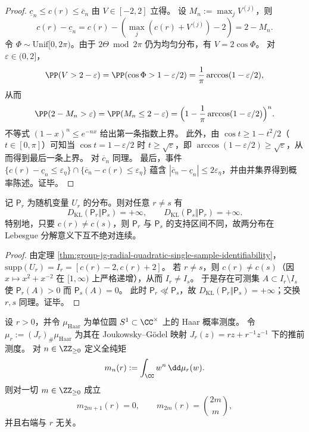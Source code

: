 \begin{proof}
\(\underline c_n\le c(r)\le \overline c_n\) 由 \(V\in[-2,2]\) 立得。
设 \(M_n:=\max_j V^{(j)}\)，则
\[
c(r)-\underline c_n=c(r)-(\max_j(c(r)+V^{(j)})-2)=2-M_n.
\]
令 \(\Phi\sim\mathrm{Unif}[0,2\pi)\)。由于 \(2\Theta\bmod 2\pi\) 仍为均匀分布，有 \(V=2\cos\Phi\)。
对 \(\varepsilon\in(0,2]\)，
\[
\PP(V>2-\varepsilon)=\PP(\cos\Phi>1-\varepsilon/2)=\frac{1}{\pi}\arccos(1-\varepsilon/2),
\]
从而
\[
\PP(2-M_n>\varepsilon)=\PP(M_n\le 2-\varepsilon)
=\Bigl(1-\frac{1}{\pi}\arccos(1-\varepsilon/2)\Bigr)^{n}.
\]
不等式 \((1-x)^n\le e^{-nx}\) 给出第一条指数上界。
此外，由 \(\cos t\ge 1-t^2/2\)（\(t\in[0,\pi]\)）可知当 \(\cos t=1-\varepsilon/2\) 时 \(t\ge \sqrt{\varepsilon}\)，即
\(
\arccos(1-\varepsilon/2)\ge \sqrt{\varepsilon}
\)，从而得到最后一条上界。
对 \(\overline c_n\) 同理。
最后，事件
\(
\{c(r)-\underline c_n\le \varepsilon_\eta\}\cap\{\overline c_n-c(r)\le \varepsilon_\eta\}
\)
蕴含 \(|\overline c_n-\underline c_n|\le 2\varepsilon_\eta\)，并由并集界得到概率陈述。证毕。
\end{proof}

\begin{proposition}\label{prop:group-jg-radial-quadratic-kl-infinite}
记 \(\mathsf P_r\) 为随机变量 \(U_r\) 的分布。则对任意 \(r\neq s\) 有
\[
D_{\mathrm{KL}}(\mathsf P_r\Vert \mathsf P_s)=+\infty,
\qquad
D_{\mathrm{KL}}(\mathsf P_s\Vert \mathsf P_r)=+\infty.
\]
特别地，只要 \(c(r)\neq c(s)\)，则 \(\mathsf P_r\) 与 \(\mathsf P_s\) 的支持区间不同，故两分布在 Lebesgue 分解意义下互不绝对连续。
\end{proposition}

\begin{proof}
由定理 \ref{thm:group-jg-radial-quadratic-single-sample-identifiability}，\(\mathrm{supp}(U_r)=I_r=[c(r)-2,c(r)+2]\)。
若 \(r\neq s\)，则 \(c(r)\neq c(s)\)（因 \(x\mapsto x^2+x^{-2}\) 在 \([1,\infty)\) 上严格递增），从而 \(I_r\neq I_s\)。
于是存在可测集 \(A\subset I_r\setminus I_s\) 使 \(\mathsf P_r(A)>0\) 而 \(\mathsf P_s(A)=0\)。
此时 \(\mathsf P_r\not\ll \mathsf P_s\)，故 \(D_{\mathrm{KL}}(\mathsf P_r\Vert \mathsf P_s)=+\infty\)；交换 \(r,s\) 同理。证毕。
\end{proof}

\begin{theorem}\label{thm:group-jg-holomorphic-moment-rigidity}
设 \(r>0\)，并令 \(\mu_{\mathrm{Haar}}\) 为单位圆 \(S^1\subset\CC^\times\) 上的 Haar 概率测度。
令 \(\mu_r:=(J_r)_\#\mu_{\mathrm{Haar}}\) 为其在 Joukowsky--Gödel 映射 \(J_r(z)=rz+r^{-1}z^{-1}\) 下的推前测度。
对 \(n\in\ZZ_{\ge 0}\) 定义全纯矩
\[
m_n(r):=\int_{\CC} w^n\,\dd\mu_r(w).
\]
则对一切 \(m\in\ZZ_{\ge 0}\) 成立
\[
m_{2m+1}(r)=0,
\qquad
m_{2m}(r)=\binom{2m}{m},
\]
并且右端与 \(r\) 无关。
\end{theorem}


